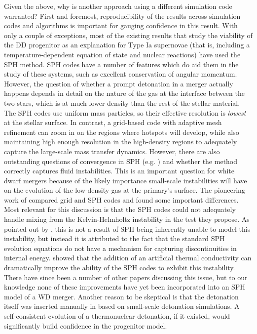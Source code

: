 \documentclass[12pt,preprint]{aastex}
\begin{document}
Given the above, why is another approach using a different simulation code warranted? First and foremost, reproducibility of the results across simulation codes and algorithms is important for gauging confidence in this result. With only a couple of exceptions, most of the existing results that study the viability of the DD progenitor as an explanation for Type Ia supernovae (that is, including a temperature-dependent equation of state and nuclear reactions) have used the SPH method. SPH codes have a number of features which do aid them in the study of these systems, such as excellent conservation of angular momentum. However, the question of whether a prompt detonation in a merger actually happens depends in detail on the nature of the gas at the interface between the two stars, which is at much lower density than the rest of the stellar material. The SPH codes use uniform mass particles, so their effective resolution is \textit{lowest} at the stellar surface. In contrast, a grid-based code with adaptive mesh refinement can zoom in on the regions where hotspots will develop, while also maintaining high enough resolution in the high-density regions to adequately capture the large-scale mass transfer dynamics. However, there are also outstanding questions of convergence in SPH (e.g. \cite{zhu_SPH:2014}) and whether the method correctly captures fluid instabilities. This is an important question for white dwarf mergers because of the likely importance small-scale instabilities will have on the evolution of the low-density gas at the primary's surface. The pioneering work of \cite{agertz:2007} compared grid and SPH codes and found some important differences. Most relevant for this discussion is that the SPH codes could not adequately handle mixing from the Kelvin-Helmholtz instability in the test they propose. As pointed out by \cite{price:2008}, this is not a result of SPH being inherently unable to model this instability, but instead it is attributed to the fact that the standard SPH evolution equations do not have a mechanism for capturing discontinuities in internal energy. \citeauthor{price:2008} showed that the addition of an artificial thermal conductivity can dramatically improve the ability of the SPH codes to exhibit this instability. There have since been a number of other papers discussing this issue, but to our knowledge none of these improvements have yet been incorporated into an SPH model of a WD merger. Another reason to be skeptical is that the detonation itself was inserted manually in \cite{pakmor:2010} based on small-scale detonation simulations. A self-consistent evolution of a thermonuclear detonation, if it existed, would significantly build confidence in the progenitor model.
\end{document}

